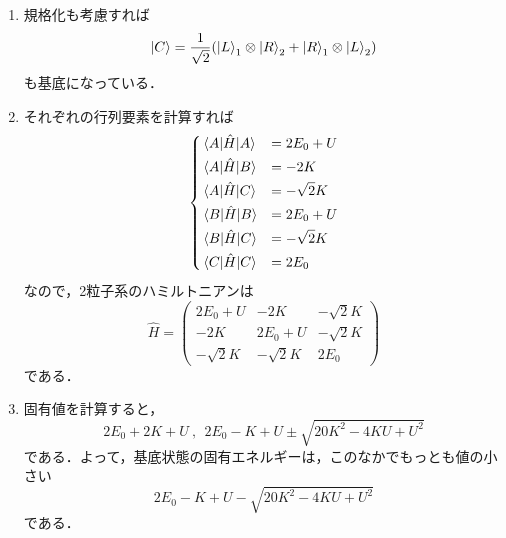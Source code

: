 \documentclass[a4paper,pdflatex,ja=standard]{bxjsarticle}
\begin{document}
\begin{enumerate}
  \item 
  規格化も考慮すれば
  \begin{equation}
    \ket{C}
    =
    \frac{1}{\sqrt{2}}
    (
      \ket{L}_{1}\otimes\ket{R}_{2}
      +
      \ket{R}_{1}\otimes\ket{L}_{2}
    )
  \end{equation}
  も基底になっている．

  \item 
  それぞれの行列要素を計算すれば
  \begin{equation}
    \begin{dcases}
      \ev*{A|\hat{H}|A}
      &=
      2E_{0}+U
      \\
      \ev*{A|\hat{H}|B}
      &=
      -2K
      \\
      \ev*{A|\hat{H}|C}
      &=
      -\sqrt{2}K
      \\
      \ev*{B|\hat{H}|B}
      &=      
      2E_{0}+U
      \\
      \ev*{B|\hat{H}|C}
      &=      
      -\sqrt{2}K
      \\
      \ev*{C|\hat{H}|C}
      &= 
      2E_{0}
    \end{dcases}
  \end{equation}
  なので，2粒子系のハミルトニアンは
  \begin{equation}
    \hat{H}
    =
    \begin{pmatrix}
      2E_{0} + U & -2K & -\sqrt{2}K \\
      -2K & 2E_{0} + U & -\sqrt{2}K \\
      -\sqrt{2}K  & -\sqrt{2}K & 2E_{0}
    \end{pmatrix}
  \end{equation}
  である．

  \item 
  固有値を計算すると，
  \begin{equation}
    2E_{0}+2K+U
    \ ,\ \ 
    2E_{0}-K+U\pm\sqrt{20K^2-4KU+U^2}
  \end{equation}
  である．よって，基底状態の固有エネルギーは，このなかでもっとも値の小さい
  \begin{equation}
    2E_{0}-K+U-\sqrt{20K^2-4KU+U^2}
  \end{equation}
  である．

\end{enumerate}
\end{document}
